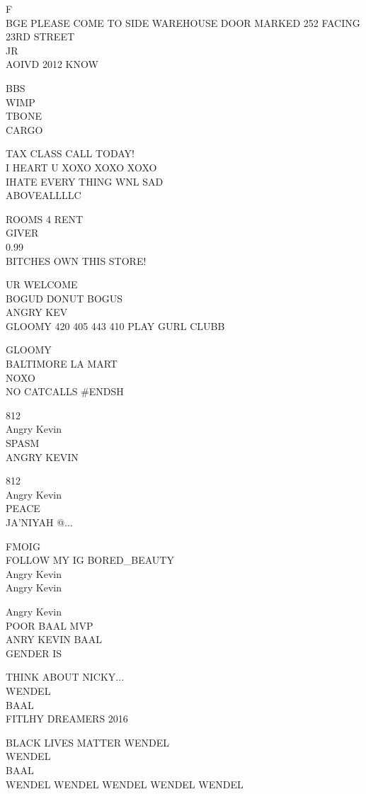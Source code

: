 \documentclass[10pt,letterpaper]{article}
\begin{document}
F\\
BGE PLEASE COME TO SIDE WAREHOUSE DOOR MARKED 252 FACING 23RD STREET\\
JR\\
AOIVD 2012 KNOW

BBS\\
WIMP\\
TBONE\\
CARGO

TAX CLASS CALL TODAY!\\
I HEART U XOXO XOXO XOXO\\
IHATE EVERY THING WNL SAD\\
ABOVEALLLLC

ROOMS 4 RENT\\
GIVER\\
0.99\\
BITCHES OWN THIS STORE!

UR WELCOME\\
BOGUD DONUT BOGUS\\
ANGRY KEV\\
GLOOMY 420 405 443 410 PLAY GURL CLUBB

GLOOMY\\
BALTIMORE LA MART\\
NOXO\\
NO CATCALLS \#ENDSH

812\\
Angry Kevin\\
SPASM\\
ANGRY KEVIN

812\\
Angry Kevin\\
PEACE\\
JA'NIYAH @...

FMOIG\\
FOLLOW MY IG BORED\_BEAUTY\\
Angry Kevin\\
Angry Kevin

Angry Kevin\\
POOR BAAL MVP\\
ANRY KEVIN BAAL\\
GENDER IS

THINK ABOUT NICKY...\\
WENDEL\\
BAAL\\
FITLHY DREAMERS 2016

BLACK LIVES MATTER WENDEL\\
WENDEL\\
BAAL\\
WENDEL WENDEL WENDEL WENDEL WENDEL
\end{document}
